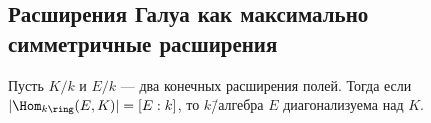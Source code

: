 \documentclass[
	extrafontsizes,
	11pt,
	hyphens,
]{memoir}
\begin{document}
\subsection{Расширения Галуа как максимально симметричные расширения}





\begin{theorem}
Пусть \(K/k\) и \(E/k\) --- два конечных расширения полей.%
\label{thm:MaxSymFieldExt}
Тогда если \(\lvert \Hom_{k\ring}(E,K) \rvert = [E : k]\), то
\(k\)\=/алгебра \(E\) диагонализуема над \(K\).
\end{theorem}
\end{document}
